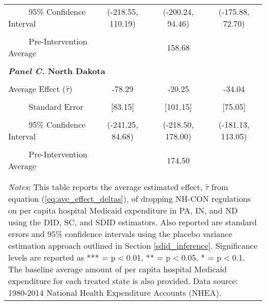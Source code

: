 \documentclass[12pt]{article}
\begin{document}
\begin{table}[htbp]
\begin{tabular}{l*{3}{c}}
\\[-2ex]
\multicolumn{1}{l}{\ \ \ \ \ 95\% Confidence Interval}&   \multicolumn{1}{c}{(-218.55, 110.19)}&   \multicolumn{1}{c}{(-200.24, 94.46)}&   \multicolumn{1}{c}{(-175.88, 72.70)}\\
\\[-2ex]
\multicolumn{1}{l}{\ \ \ \ \ Pre-Intervention Average}&   \multicolumn{3}{c}{158.68}\\
\\[-.1ex]
\multicolumn{4}{l}{\textbf{\textit{Panel C.} North Dakota}}\\
\\[-1.5ex]
\multicolumn{1}{l}{Average Effect ($\hat{\tau}$)}&   \multicolumn{1}{c}{-78.29} &   \multicolumn{1}{c}{-20.25}&  \multicolumn{1}{c}{-34.04}\\
\\[-2ex]
\multicolumn{1}{l}{\ \ \ \ \ Standard Error}  &\multicolumn{1}{c}{[83.15]}&\multicolumn{1}{c}{[101.15]}&\multicolumn{1}{c}{[75.05]}\\
\\[-2ex]
\multicolumn{1}{l}{\ \ \ \ \ 95\% Confidence Interval}&   \multicolumn{1}{c}{(-241.25, 84.68)}&   \multicolumn{1}{c}{(-218.50, 178.00)}&   \multicolumn{1}{c}{(-181.13, 113.05)}\\
\\[-2ex]
\multicolumn{1}{l}{\ \ \ \ \ Pre-Intervention Average}&   \multicolumn{3}{c}{174.50}\\
\\[-.1ex]
\hline\hline
\\[-2ex]
\multicolumn{4}{p{.8\linewidth}}{\footnotesize \textit{Notes}: This table reports the average estimated effect, $\hat{\tau}$ from equation (\ref{eq:ave_effect_deltas}), of dropping NH-CON regulations on per capita hospital Medicaid expenditure in PA, IN, and ND using the DID, SC, and SDID estimators. Also reported are standard errors and 95\% confidence intervals using the placebo variance estimation approach outlined in Section \ref{sdid_inference}. Significance levels are reported as *** = p$<$0.01, ** = p$<$0.05, * = p$<$0.1. The baseline average amount of per capita hospital Medicaid expenditure for each treated state is also provided. Data source: 1980-2014 National Health Expenditure Accounts (NHEA).}
\end{tabular}
\end{table}
\vfill
\end{document}
